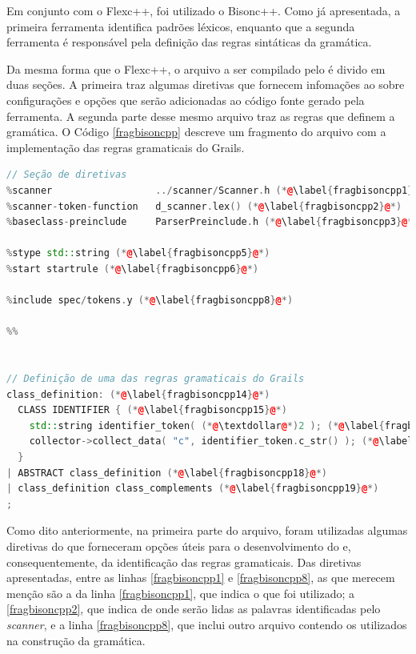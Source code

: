 Em conjunto com o \textsf{Flexc++}, foi utilizado o \textsf{Bisonc++}. Como já
apresentada, a primeira ferramenta identifica padrões léxicos, enquanto que a
segunda ferramenta é responsável pela definição das regras sintáticas da
gramática.

Da mesma forma que o \textsf{Flexc++}, o arquivo a ser compilado pelo \bisoncpp é divido
em duas seções. A primeira traz algumas diretivas que fornecem infomações ao
\bisoncpp sobre configurações e opções que serão adicionadas ao código fonte
gerado pela ferramenta. A segunda parte desse mesmo arquivo traz as regras
que definem a gramática. O Código \ref{fragbisoncpp} descreve um fragmento
do arquivo com a implementação das regras gramaticais do \textsf{Grails}.

\begin{lstlisting}[language=C++, label=fragbisoncpp, caption=Fragmento do código fonte para o \bisoncpp]
// Seção de diretivas
%scanner                  ../scanner/Scanner.h (*@\label{fragbisoncpp1}@*)
%scanner-token-function   d_scanner.lex() (*@\label{fragbisoncpp2}@*)
%baseclass-preinclude     ParserPreinclude.h (*@\label{fragbisoncpp3}@*)

%stype std::string (*@\label{fragbisoncpp5}@*)
%start startrule (*@\label{fragbisoncpp6}@*)

%include spec/tokens.y (*@\label{fragbisoncpp8}@*)

%%


// Definição de uma das regras gramaticais do Grails
class_definition: (*@\label{fragbisoncpp14}@*)
  CLASS IDENTIFIER { (*@\label{fragbisoncpp15}@*)
    std::string identifier_token( (*@\textdollar@*)2 ); (*@\label{fragbisoncpp16}@*)
    collector->collect_data( "c", identifier_token.c_str() ); (*@\label{fragbisoncpp17}@*)
  }
| ABSTRACT class_definition (*@\label{fragbisoncpp18}@*)
| class_definition class_complements (*@\label{fragbisoncpp19}@*)
;
\end{lstlisting}

Como dito anteriormente, na primeira parte do arquivo, foram utilizadas algumas
diretivas do \bisoncpp que forneceram opções úteis para o desenvolvimento do
\parser e, consequentemente, da identificação das regras gramaticais. Das
diretivas apresentadas, entre as linhas \ref{fragbisoncpp1} e
\ref{fragbisoncpp8}, as que merecem menção são a da linha
\ref{fragbisoncpp1}, que indica o \scanner que foi utilizado;
a \ref{fragbisoncpp2}, que indica de onde serão lidas as palavras identificadas
pelo \textit{scanner}, e a linha \ref{fragbisoncpp8}, que inclui outro
arquivo contendo os \tokens utilizados na construção da gramática.

